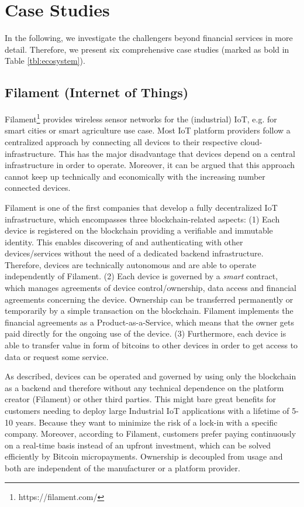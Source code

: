 \section{Case Studies}
\label{sec:eco:cases}


In the following, we investigate the challengers beyond financial services in more 
detail. Therefore, we present six comprehensive case studies (marked as bold in Table 
\ref{tbl:ecosystem}).

\subsection{Filament (Internet of Things)}
\label{sec:ecofilament}

Filament\footnote{https://filament.com/} provides wireless sensor networks for the (industrial) IoT, e.g. 
for smart cities or smart agriculture use case. Most IoT platform providers follow 
a centralized approach by connecting all devices to their respective cloud-infrastructure. 
This has the major disadvantage that devices depend on a central infrastructure 
in order to operate. Moreover, it can be argued that this approach cannot keep 
up technically and economically with the increasing number connected devices.

Filament is one of the first companies that develop a fully decentralized IoT infrastructure, 
which encompasses three blockchain-related aspects: (1) Each device is registered 
on the blockchain providing a verifiable and immutable identity. This enables discovering 
of and authenticating with other devices/services without the need of a dedicated 
backend infrastructure. Therefore, devices are technically autonomous and are able 
to operate independently of Filament. (2) Each device is governed by a \emph{smart} 
contract, which manages agreements of device control/ownership, data access and 
financial agreements concerning the device. Ownership can be transferred permanently 
or temporarily by a simple transaction on the blockchain. Filament implements the 
financial agreements as a Product-as-a-Service, which means that the owner gets 
paid directly for the ongoing use of the device. (3) Furthermore, each device is 
able to transfer value in form of bitcoins to other devices in order to get access 
to data or request some service.

As described, devices can be operated and governed by using only the blockchain 
as a backend and therefore without any technical dependence on the platform creator 
(Filament) or other third parties. This might bare great benefits for customers 
needing to deploy large Industrial IoT applications with a lifetime of 5-10 years. 
Because they want to minimize the risk of a lock-in with a specific company. Moreover, 
according to Filament, customers prefer paying continuously on a real-time basis 
instead of an upfront investment, which can be solved efficiently by Bitcoin micropayments. 
Ownership is decoupled from usage and both are independent of the manufacturer 
or a platform provider.

